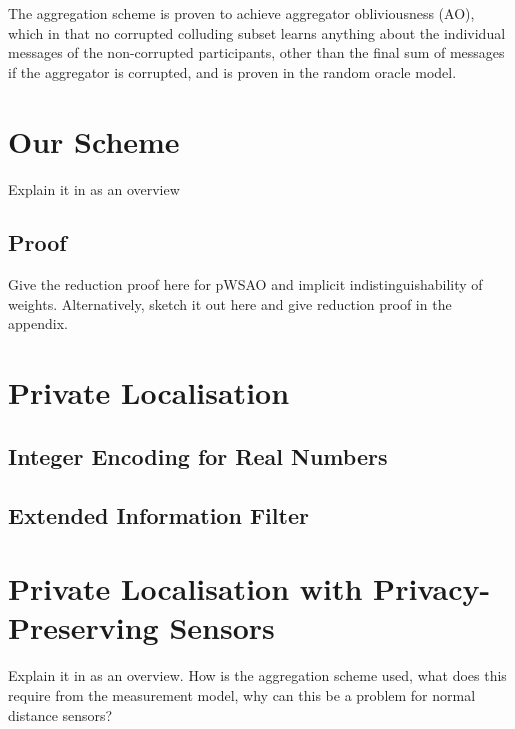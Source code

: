 \documentclass[twocolumn]{autart}
\theoremstyle{definition}
\begin{document}
The aggregation scheme is proven to achieve aggregator obliviousness (AO), which in that no corrupted colluding subset learns anything about the individual messages of the non-corrupted participants, other than the final sum of messages if the aggregator is corrupted, and is proven in the random oracle model.

\section{Our Scheme}
Explain it in as an overview


\subsection{Proof}
Give the reduction proof here for pWSAO and implicit indistinguishability of weights. Alternatively, sketch it out here and give reduction proof in the appendix.


\section{Private Localisation}

\subsection{Integer Encoding for Real Numbers}

\subsection{Extended Information Filter}


\section{Private Localisation with Privacy-Preserving Sensors} \label{sec:private_localisation}
Explain it in as an overview. How is the aggregation scheme used, what does this require from the measurement model, why can this be a problem for normal distance sensors?
\end{document}
